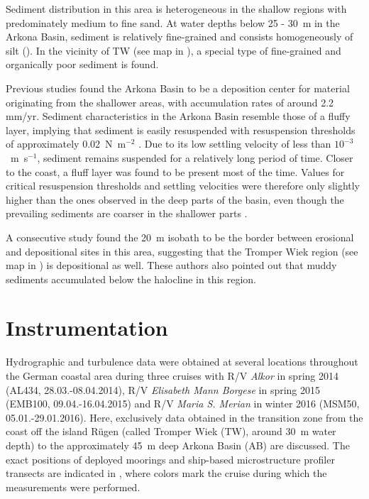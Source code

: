   Sediment distribution in this area is heterogeneous in the shallow regions 
with predominately medium to fine sand. At water depths below 25 - 30~m in the 
Arkona Basin, sediment is relatively fine-grained and consists homogeneously of 
silt (). In the vicinity of TW (see map in ), a 
special type of fine-grained 
and organically poor sediment is found. 

Previous studies \citep[][]{leipe2000, basys1} found the Arkona Basin to be a 
deposition center for material originating from the shallower areas, with 
accumulation rates of around 2.2 mm/yr. Sediment characteristics in the Arkona 
Basin resemble those of a fluffy layer, implying that sediment is easily 
resuspended with resuspension thresholds of approximately 0.02~N~m$^{-2}$ 
\citep[][determined with a LABEREX chamber from sediment core 
samples]{basys1}. %
Due to its low settling velocity of less than $10^{-3}$~m~s$^{-1}$, sediment 
remains suspended for a relatively long period of time. Closer to the coast, a 
fluff layer was found to be present most of the time. Values for critical 
resuspension thresholds and settling velocities were therefore only slightly 
higher than the ones observed in the deep parts of the basin, even though the 
prevailing sediments are coarser in the shallower parts \citep[][]{basys1}. %

A consecutive study \citep[][]{basys2} found the 20~m isobath to be the border 
between erosional and depositional sites in this area, suggesting that the 
Tromper Wiek region (see map in ) is depositional as well. These 
authors also pointed out that 
muddy sediments accumulated below the halocline in this region.
\FloatBarrier
\section{Instrumentation}

Hydrographic and turbulence data were obtained at several locations throughout 
the 
German coastal area during three cruises with R/V \textit{Alkor} in spring 2014 
(AL434, 28.03.-08.04.2014), R/V \textit{Elisabeth Mann Borgese} in spring 2015 
(EMB100, 09.04.-16.04.2015) and R/V \textit{Maria S. Merian} in winter 2016 
(MSM50, 05.01.-29.01.2016). Here, exclusively data obtained in the 
transition zone from the coast off 
the island R\"{u}gen (called Tromper Wiek (TW), around 30~m water depth) to 
the approximately 45~m deep Arkona Basin (AB) are discussed. The exact 
positions of deployed 
moorings and ship-based microstructure profiler transects are indicated in 
, where colors mark the cruise during which the measurements 
were performed.

